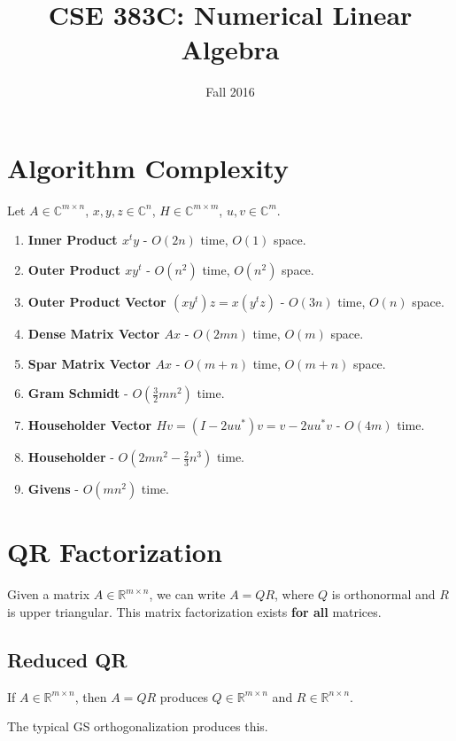 \documentclass{article}
\title{CSE 383C: Numerical Linear Algebra}
\date{Fall 2016}
\theoremstyle{definition}
\begin{document}
\maketitle

\section{Algorithm Complexity}

Let $A \in \mathbb{C}^{m \times n}$, $x, y, z \in \mathbb{C}^n$, $H \in \mathbb{C}^{m \times m}$, $u, v \in \mathbb{C}^{m}$.

\begin{enumerate}[label=\textbf{\roman*.}]
    \item \textbf{Inner Product $x^t y$} - $O(2n)$ time, $O(1)$ space.
    \item \textbf{Outer Product $x y^t$} - $O(n^2)$ time, $O(n^2)$ space.
    \item \textbf{Outer Product Vector $(x y^t) z = x (y^t z)$} - $O(3n)$ time, $O(n)$ space.
    \item \textbf{Dense Matrix Vector $Ax$} - $O(2mn)$ time, $O(m)$ space.
    \item \textbf{Spar Matrix Vector $Ax$} - $O(m + n)$ time, $O(m + n)$ space.
    \item \textbf{Gram Schmidt} - $O(\frac{3}{2}mn^2)$ time.
    \item \textbf{Householder Vector $Hv = (I - 2 u u^*) v = v - 2 u u^* v$} - $O(4m)$ time.
    \item \textbf{Householder} - $O(2mn^2-\frac{2}{3}n^3)$ time.
    \item \textbf{Givens} - $O(mn^2)$ time.
\end{enumerate}

\section{QR Factorization}
Given a matrix $A \in \mathbb{R}^{m \times n}$, we can write $A = QR$, where $Q$ is orthonormal and $R$ is upper triangular. This matrix factorization exists \textbf{for all} matrices.

\subsection{Reduced QR}
If $A \in \mathbb{R}^{m \times n}$, then $A = QR$ produces $Q \in \mathbb{R}^{m \times n}$ and $R \in \mathbb{R}^{n \times n}$.

The typical GS orthogonalization produces this.
\end{document}
